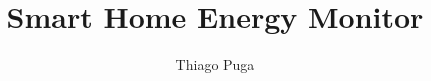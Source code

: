 \documentclass{article}
\begin{document}
%
\title{Smart Home Energy Monitor}

\author{Thiago Puga}






\maketitle
\end{document}
